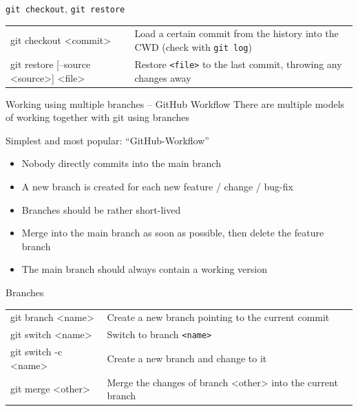 \begin{frame}{\texttt{git checkout}, \texttt{git restore}}
  \begin{tabu}{>{\ttfamily}l X[,L]}
    git checkout <commit> & Load a certain commit from the history into the CWD (check with \texttt{git log}) \\
    git restore [--source <source>]  <file>   & Restore \texttt{<file>} to the last commit, throwing any changes away
  \end{tabu}
\end{frame}

\begin{frame}[c]{Working using multiple branches – GitHub Workflow}
  There are multiple models of working together with git using branches

  Simplest and most popular: \enquote{GitHub-Workflow}

  \begin{itemize}
    \item Nobody directly commits into the main branch
    \item A new branch is created for each new feature / change / bug-fix
    \item Branches should be rather short-lived
    \item Merge into the main branch as soon as possible, then delete the feature branch
    \item The main branch should always contain a working version
  \end{itemize}
\end{frame}

\begin{frame}{Branches}
  \begin{tabu}{>{\ttfamily}l X[,L]}
    git branch <name> & Create a new branch pointing to the current commit\\
    git switch <name> & Switch to branch \texttt{<name>} \\
    git switch -c <name> & Create a new branch and change to it \\
    git merge <other> & Merge the changes of branch <other> into the current branch
  \end{tabu}
\end{frame}

